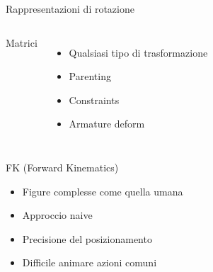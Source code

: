 \documentclass[10pt]{beamer}
\begin{document}
\begin{frame}{Rappresentazioni di rotazione}
\begin{columns}[T,onlytextwidth]
    Matrici																			%
      \begin{itemize}[<+- | alert@+>]						%
				\item Qualsiasi tipo di trasformazione	%
				\item Parenting				%
        \item Constraints			%
				\item Armature deform	%
      \end{itemize}
  \end{columns}
\end{frame}

\begin{frame}{FK (Forward Kinematics)}					%
		\begin{itemize}[<+- | alert@+>]							%
    \item Figure complesse come quella umana    %
    \item Approccio naive												%
		\item Precisione del posizionamento					%
    \item Difficile animare azioni comuni				%
  \end{itemize}
\end{frame}
\end{document}
